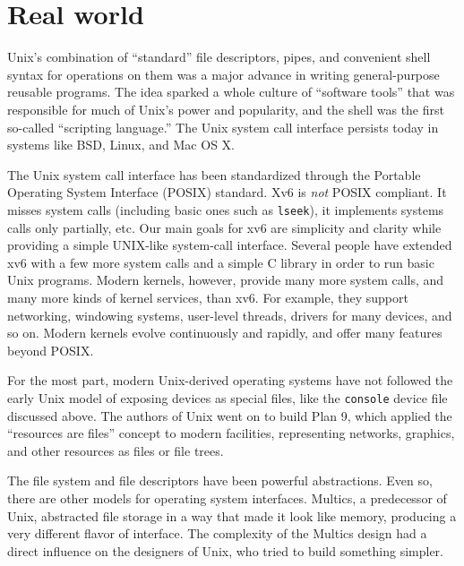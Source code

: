 \section{Real world}

Unix's combination of ``standard'' file
descriptors, pipes, and convenient shell syntax for
operations on them was a major advance in writing
general-purpose reusable programs.
The idea sparked a whole culture of ``software tools'' that was
responsible for much of Unix's power and popularity,
and the shell was the first so-called ``scripting language.''
The Unix system call interface persists today in systems like
BSD, Linux, and Mac OS X.

The Unix system call interface has been standardized through the Portable
Operating System Interface (POSIX) standard.
Xv6 is
\textit{not}
POSIX compliant.  It misses system calls (including basic ones such as
\lstinline{lseek}),
it implements systems calls only partially, etc.  Our main goals for xv6 are
simplicity and clarity while providing a simple UNIX-like system-call interface.
Several people have extended xv6 with a few more system calls and a simple
C library in order to run basic Unix programs.  Modern kernels, however,
provide many more system calls, and many more kinds of kernel services, than
xv6.  For example, they support networking, windowing systems, user-level threads,
drivers for many devices, and so on.  Modern kernels evolve continuously and
rapidly, and offer many features beyond POSIX.

For the most part, modern Unix-derived operating systems
have not followed the early
Unix model of exposing devices as special files, like the
\lstinline{console}
device file discussed above.
The authors of Unix went on to build Plan 9,
which applied the ``resources are files''
concept to modern facilities,
representing networks, graphics, and other resources
as files or file trees.

The file system and file descriptors have been  powerful
abstractions.
Even so, there are other models for operating system interfaces.
Multics, a predecessor of Unix,
abstracted file storage in a way that made it look like memory,
producing a very different flavor of interface.
The complexity of the Multics design had a direct influence
on the designers of Unix, who tried to build something simpler.

